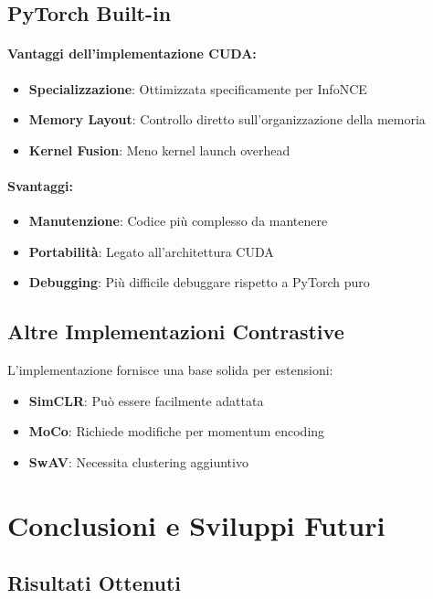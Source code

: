 \documentclass[a4paper,11pt]{article}
\begin{document}
\subsection{PyTorch Built-in}

\paragraph{Vantaggi dell'implementazione CUDA:}
\begin{itemize}
    \item \textbf{Specializzazione}: Ottimizzata specificamente per InfoNCE
    \item \textbf{Memory Layout}: Controllo diretto sull'organizzazione della memoria
    \item \textbf{Kernel Fusion}: Meno kernel launch overhead
\end{itemize}

\paragraph{Svantaggi:}
\begin{itemize}
    \item \textbf{Manutenzione}: Codice più complesso da mantenere
    \item \textbf{Portabilità}: Legato all'architettura CUDA
    \item \textbf{Debugging}: Più difficile debuggare rispetto a PyTorch puro
\end{itemize}

\subsection{Altre Implementazioni Contrastive}

L'implementazione fornisce una base solida per estensioni:
\begin{itemize}
    \item \textbf{SimCLR}: Può essere facilmente adattata
    \item \textbf{MoCo}: Richiede modifiche per momentum encoding
    \item \textbf{SwAV}: Necessita clustering aggiuntivo
\end{itemize}

\section{Conclusioni e Sviluppi Futuri}

\subsection{Risultati Ottenuti}
\end{document}
